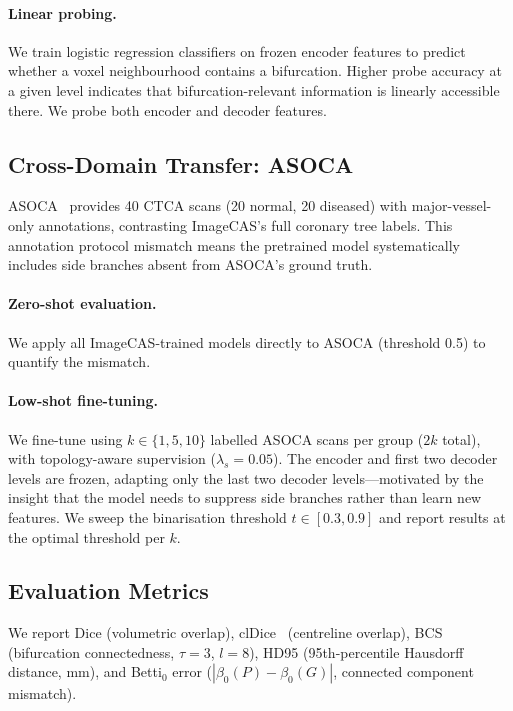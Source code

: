 \documentclass[runningheads]{llncs}
\begin{document}
\paragraph{Linear probing.}
We train logistic regression classifiers on frozen encoder features to predict whether a voxel neighbourhood contains a bifurcation.
Higher probe accuracy at a given level indicates that bifurcation-relevant information is linearly accessible there.
We probe both encoder and decoder features.

\subsection{Cross-Domain Transfer: ASOCA}
\label{sec:asoca}

ASOCA~\cite{gharleghi_asoca_2022} provides 40 CTCA scans (20 normal, 20 diseased) with major-vessel-only annotations, contrasting ImageCAS's full coronary tree labels.
This annotation protocol mismatch means the pretrained model systematically includes side branches absent from ASOCA's ground truth.

\paragraph{Zero-shot evaluation.}
We apply all ImageCAS-trained models directly to ASOCA (threshold 0.5) to quantify the mismatch.

\paragraph{Low-shot fine-tuning.}
We fine-tune using $k \in \{1, 5, 10\}$ labelled ASOCA scans per group ($2k$ total), with topology-aware supervision ($\lambda_s{=}0.05$).
The encoder and first two decoder levels are frozen, adapting only the last two decoder levels---motivated by the insight that the model needs to suppress side branches rather than learn new features.
We sweep the binarisation threshold $t \in [0.3, 0.9]$ and report results at the optimal threshold per $k$.

\subsection{Evaluation Metrics}

We report Dice (volumetric overlap), clDice~\cite{shit_cldice_2021} (centreline overlap), BCS~\cite{anonymous_bcs_2026} (bifurcation connectedness, $\tau{=}3$, $l{=}8$), HD95 (95th-percentile Hausdorff distance, mm), and Betti$_0$ error ($|\beta_0(P) - \beta_0(G)|$, connected component mismatch).
\end{document}
